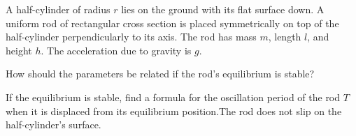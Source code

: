 \documentclass[../TST.tex]{subfiles}
\begin{document}
\begin{pproblem}
A half-cylinder of radius $r$ lies on the ground with its flat surface down. A uniform rod of rectangular cross section is placed symmetrically on top of the half-cylinder perpendicularly to its axis. The rod has mass $m$, length $l$, and height $h$. The acceleration due to gravity is $g$.
\begin{subpart}
	\item How should the parameters be related if the rod's equilibrium is stable?
	\item If the equilibrium is stable, find a formula for the oscillation period of the rod $T$ when it is displaced from its equilibrium position.The rod does not slip on the half-cylinder's surface.
\end{subpart}
\end{pproblem}
\ifprob \else
\end{document}

